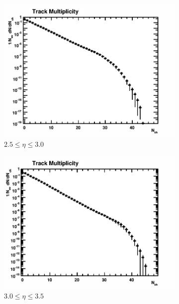 \begin{figure}[H]
\begin{subfigure}{0.32\textwidth}
		\includegraphics[width=\textwidth]{Chapters/multiplicity/images/background_corrected/real/2-5_3-0_norm.png}
		\caption{$2.5 \le \eta \le 3.0$}
	\end{subfigure}
	\begin{subfigure}{0.32\textwidth}
		\includegraphics[width=\textwidth]{Chapters/multiplicity/images/background_corrected/real/3-0_3-5_norm.png}
		\caption{$3.0 \le \eta \le 3.5$}
	\end{subfigure}
	\begin{subfigure}{0.32\textwidth}

\end{subfigure}
\end{figure}
